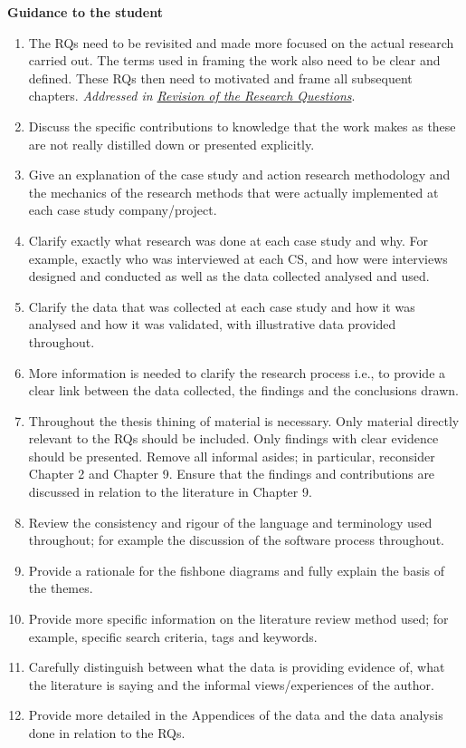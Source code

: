 \textbf{Guidance to the student}
\begin{enumerate}
    \item The RQs need to be revisited and made more focused on the actual research carried out. The terms used in framing the work also need to be clear and defined. These RQs then need to motivated and frame all subsequent chapters. \emph{Addressed in \href{corrections-rqs}{Revision of the Research Questions}}.
    \item Discuss the specific contributions to knowledge that the work makes as these are not really distilled down or presented explicitly.
    \item Give an explanation of the case study and action research methodology and the mechanics of the research methods that were actually implemented at each case study company/project.
    \item Clarify exactly what research was done at each case study and why. For example, exactly who was interviewed at each CS, and how were interviews designed and conducted as well as the data collected analysed and used.
    \item Clarify the data that was collected at each case study and how it was analysed and how it was validated, with illustrative data provided throughout.
    \item More information is needed to clarify the research process i.e., to provide a clear link between the data collected, the findings and the conclusions drawn.
    \item Throughout the thesis thining of material is necessary. Only material directly relevant to the RQs should be included. Only findings with clear evidence should be presented. Remove all informal asides; in particular, reconsider Chapter 2 and Chapter 9. Ensure that the findings and contributions are discussed in relation to the literature in Chapter 9.
    \item Review the consistency and rigour of the language and terminology used throughout; for example the discussion of the software process throughout.
    \item Provide a rationale for the fishbone diagrams and fully explain the basis of the themes.
    \item Provide more specific information on the literature review method used; for example, specific search criteria, tags and keywords.
    \item Carefully distinguish between what the data is providing evidence of, what the literature is saying and the informal views/experiences of the author.
    \item Provide more detailed in the Appendices of the data and the data analysis done in relation to the RQs.
\end{enumerate}

